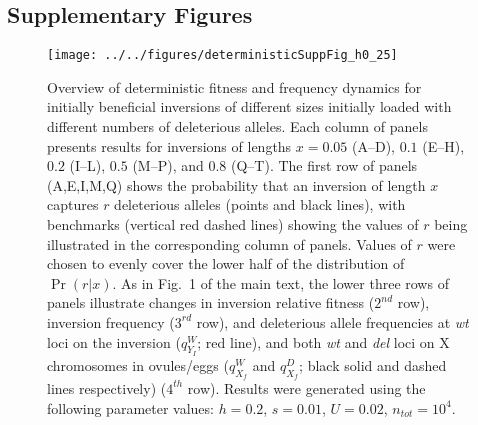 \documentclass{article}
\begin{document}
\begin{appendices}
\section{Supplementary Figures} \label{SuppFigs-App}
 \renewcommand{\theequation}{C\arabic{equation}}
 \setcounter{equation}{0}
 \renewcommand{\thefigure}{S\arabic{figure}}
 \setcounter{figure}{0}


 \begin{figure}[htbp]
 \centering
 \texttt{[image: ../../figures/deterministicSuppFig\_h0\_25]}
 \caption{Overview of deterministic fitness and frequency dynamics for initially beneficial inversions of different sizes initially loaded with different numbers of deleterious alleles. Each column of panels presents results for inversions of lengths $x = 0.05$ (A--D), $0.1$ (E--H), $0.2$ (I--L), $0.5$ (M--P), and $0.8$ (Q--T). The first row of panels (A,E,I,M,Q) shows the probability that an inversion of length $x$ captures $r$ deleterious alleles (points and black lines), with benchmarks (vertical red dashed lines) showing the values of $r$ being illustrated in the corresponding column of panels. Values of $r$ were chosen to evenly cover the lower half of the distribution of $\Pr(r | x)$. As in Fig.~1 of the main text, the lower three rows of panels illustrate changes in inversion relative fitness ($2^{nd}$ row), inversion frequency ($3^{rd}$ row), and deleterious allele frequencies at {\itshape wt} loci on the inversion ($q_{Y_I}^{W}$; red line), and both {\itshape wt} and {\itshape del} loci on X chromosomes in ovules/eggs ($q_{X_f}^{W}$ and $q_{X_f}^{D}$; black solid and dashed lines respectively) ($4^{th}$ row). Results were generated using the following parameter values: $h = 0.2$, $s = 0.01$, $U = 0.02$, $n_{tot} = 10^4$.}
 \label{fig:DetermDynamics_h0.25}
 \end{figure}



\end{appendices}
\end{document}
